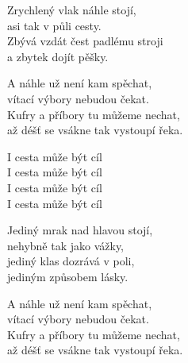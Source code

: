 
\ve{}
Zrychlený vlak náhle stojí,\\
asi tak v půli cesty.\\
Zbývá vzdát čest padlému stroji\\
a zbytek dojít pěšky.

\ve{}
A náhle už není kam spěchat,\\
vítací výbory nebudou čekat.\\
Kufry a příbory tu můžeme nechat,\\
až déšť se vsákne tak vystoupí řeka.

\cho{}
I cesta může být cíl\\
I cesta může být cíl\\
I cesta může být cíl\\
I cesta může být cíl

\ve{}
Jediný mrak nad hlavou stojí,\\
nehybně tak jako vážky,\\
jediný klas dozrává v poli,\\
jediným způsobem lásky.

\ve{}
A náhle už není kam spěchat,\\
vítací výbory nebudou čekat.\\
Kufry a příbory tu můžeme nechat,\\
až déšť se vsákne tak vystoupí řeka.

\cho{}

\esong